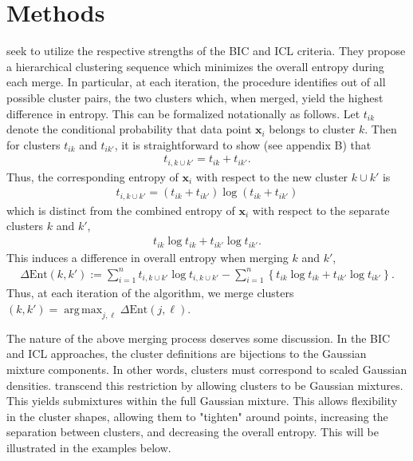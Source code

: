 \documentclass{uwstat572}
\newcommand*\ba{\[ \begin{aligned}}
\newcommand*\ea{\end{aligned} \]}
\newcommand*\bx{\mathbf{x}}
\DeclareMathOperator*{\argmax}{arg\;max}
\renewcommand\;{\,}
\begin{document}
\section{Methods}
\cite{Baudry10} seek to utilize the respective strengths of the BIC and ICL criteria.
They propose a hierarchical clustering sequence which minimizes the overall entropy during each merge.
In particular, at each iteration, the procedure identifies out of all possible cluster pairs, the two clusters which, when merged, yield the highest difference in entropy. 
This can be formalized notationally as follows.
Let $t_{ik}$ denote the conditional probability that data point $\bx_i$ belongs to cluster $k$.
Then for clusters $t_{ik}$ and $t_{ik'}$, it is straightforward to show (see appendix B) that
\ba
t_{i, k\cup k'} = t_{ik} + t_{ik'}.
\ea
Thus, the corresponding entropy of $\bx_i$ with respect to the new cluster $k \cup k'$ is
\ba
t_{i, k\cup k'} = \left(t_{ik} + t_{ik'}\right) \log\left( t_{ik} + t_{ik'} \right)
\ea
which is distinct from the combined entropy of $\bx_i$ with respect to the separate clusters $k$ and $k'$,
\ba
t_{ik} \log t_{ik} + t_{ik'} \log t_{ik'}.
\ea
This induces a difference in overall entropy when merging $k$ and $k'$, 
\ba
\Delta\text{Ent}( k, k') :=
\sum_{i=1}^n t_{i,k\cup k'} \log t_{i, k \cup k'}
- \sum_{i=1}^n \left\{ t_{ik} \log t_{ik} + t_{ik'} \log t_{ik'} \right\}.
\ea
Thus, at each iteration of the algorithm, we merge clusters $(k, k') = \argmax_{j, \ell} \Delta\text{Ent}(j, \ell)$.

The nature of the above merging process deserves some discussion.
In the BIC and ICL approaches, the cluster definitions are bijections to the Gaussian mixture components. In other words, clusters must correspond to scaled Gaussian densities.
\cite{Baudry10} transcend this restriction by allowing clusters to be Gaussian mixtures.
This yields submixtures within the full Gaussian mixture.
This allows flexibility in the cluster shapes, allowing them to "tighten" around points, increasing the separation between clusters, and decreasing the overall entropy.
This will be illustrated in the examples below.
\end{document}
